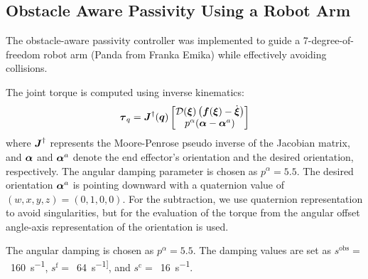 \subsection{Obstacle Aware Passivity Using a Robot Arm}
The obstacle-aware passivity controller was implemented to guide a 7-degree-of-freedom robot arm (Panda from Franka Emika) while effectively avoiding collisions. 

The joint torque is computed using inverse kinematics:
\begin{equation}
	\boldsymbol{\tau}_q = \boldsymbol{J}^{\dag}(\boldsymbol{q}) 
	\begin{bmatrix} \mathcal{D}(\boldsymbol{\xi}) \left( \boldsymbol{f}(\boldsymbol{\xi}) - \dot{\boldsymbol{\xi}} \right) \\  p^\alpha (\boldsymbol{\alpha} - \boldsymbol{\alpha}^a) \end{bmatrix}
\end{equation}
where $\boldsymbol{J}^{\dag}$ represents the Moore-Penrose pseudo inverse of the Jacobian matrix, and $\boldsymbol{\alpha}$ and $\boldsymbol{\alpha}^a$ denote the end effector's orientation and the desired orientation, respectively. The angular damping parameter is chosen as $p^\alpha = 5.5$.
The desired orientation $\boldsymbol{\alpha}^a$ is pointing downward with a quaternion value of $(w, x, y, z) = (0, 1, 0, 0)$. For the subtraction, we use quaternion representation to avoid singularities, but for the evaluation of the torque from the angular offset angle-axis representation of the orientation is used.

The angular damping is chosen as $p^\alpha = 5.5$.
The damping values are set as
$s^{\mathrm{obs}}=$~\qty{160}{s^{-1}},
$s^{\mathrm{f}}=$~\qty{64}{s^{-1]}}, and
$s^{\mathrm{c}}=$~\qty{16}{s^{-1}}.

